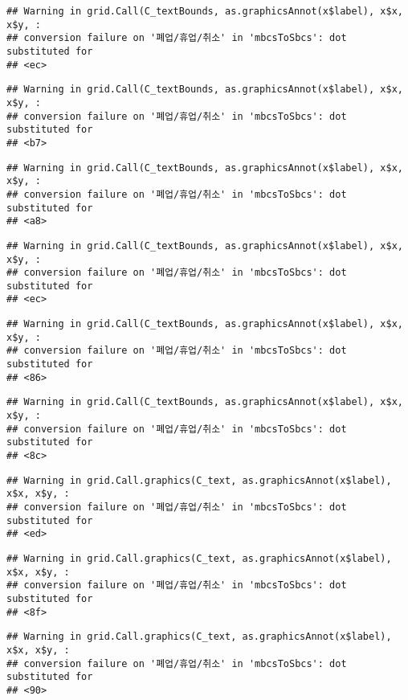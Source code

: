 \documentclass[
]{book}
\begin{document}
\begin{verbatim}
## Warning in grid.Call(C_textBounds, as.graphicsAnnot(x$label), x$x, x$y, :
## conversion failure on '폐업/휴업/취소' in 'mbcsToSbcs': dot substituted for
## <ec>
\end{verbatim}

\begin{verbatim}
## Warning in grid.Call(C_textBounds, as.graphicsAnnot(x$label), x$x, x$y, :
## conversion failure on '폐업/휴업/취소' in 'mbcsToSbcs': dot substituted for
## <b7>
\end{verbatim}

\begin{verbatim}
## Warning in grid.Call(C_textBounds, as.graphicsAnnot(x$label), x$x, x$y, :
## conversion failure on '폐업/휴업/취소' in 'mbcsToSbcs': dot substituted for
## <a8>
\end{verbatim}

\begin{verbatim}
## Warning in grid.Call(C_textBounds, as.graphicsAnnot(x$label), x$x, x$y, :
## conversion failure on '폐업/휴업/취소' in 'mbcsToSbcs': dot substituted for
## <ec>
\end{verbatim}

\begin{verbatim}
## Warning in grid.Call(C_textBounds, as.graphicsAnnot(x$label), x$x, x$y, :
## conversion failure on '폐업/휴업/취소' in 'mbcsToSbcs': dot substituted for
## <86>
\end{verbatim}

\begin{verbatim}
## Warning in grid.Call(C_textBounds, as.graphicsAnnot(x$label), x$x, x$y, :
## conversion failure on '폐업/휴업/취소' in 'mbcsToSbcs': dot substituted for
## <8c>
\end{verbatim}

\begin{verbatim}
## Warning in grid.Call.graphics(C_text, as.graphicsAnnot(x$label), x$x, x$y, :
## conversion failure on '폐업/휴업/취소' in 'mbcsToSbcs': dot substituted for
## <ed>
\end{verbatim}

\begin{verbatim}
## Warning in grid.Call.graphics(C_text, as.graphicsAnnot(x$label), x$x, x$y, :
## conversion failure on '폐업/휴업/취소' in 'mbcsToSbcs': dot substituted for
## <8f>
\end{verbatim}

\begin{verbatim}
## Warning in grid.Call.graphics(C_text, as.graphicsAnnot(x$label), x$x, x$y, :
## conversion failure on '폐업/휴업/취소' in 'mbcsToSbcs': dot substituted for
## <90>
\end{verbatim}
\end{document}
